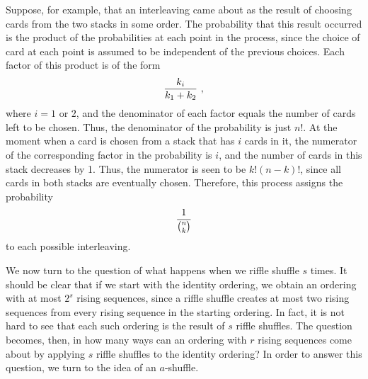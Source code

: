 Suppose, for example, that an interleaving came about as the result of choosing
cards from the two stacks in some order.  The probability that this result occurred is
the product of the probabilities at each point in the process, since the choice of
card at each point is assumed to be independent of the previous choices.  Each factor
of this product is of the form
$${{k_i}\over{k_1 + k_2}}\ ,$$ where $i = 1$ or $2$, and the denominator of each
factor equals the number of cards left to be chosen.  Thus, the denominator of the
probability is just $n!$.  At the moment when a card is chosen from a stack that has
$i$ cards in it, the numerator of the corresponding factor in the probability is $i$,
and the number of cards in this stack decreases by 1.  Thus, the numerator is seen to
be $k!(n-k)!$, since all cards in both stacks are eventually chosen.  Therefore, this
process assigns the probability 
$${1\over{{n}\choose{k}}}$$ to each possible interleaving.
\par 
We now turn to the question of what happens when we riffle shuffle $s$ times.  It
should be clear that if we start with the identity ordering, we obtain an ordering
with at most $2^s$ rising sequences, since a riffle shuffle creates at most two rising
sequences from every rising sequence in the starting ordering.  In fact, it is not
hard to see that each such ordering is the result of $s$ riffle shuffles.  The
question becomes, then, in how many ways can an ordering with $r$ rising sequences
come about by applying $s$ riffle shuffles to the identity ordering?  In order to
answer this question, we turn to the idea of an $a$-shuffle.
